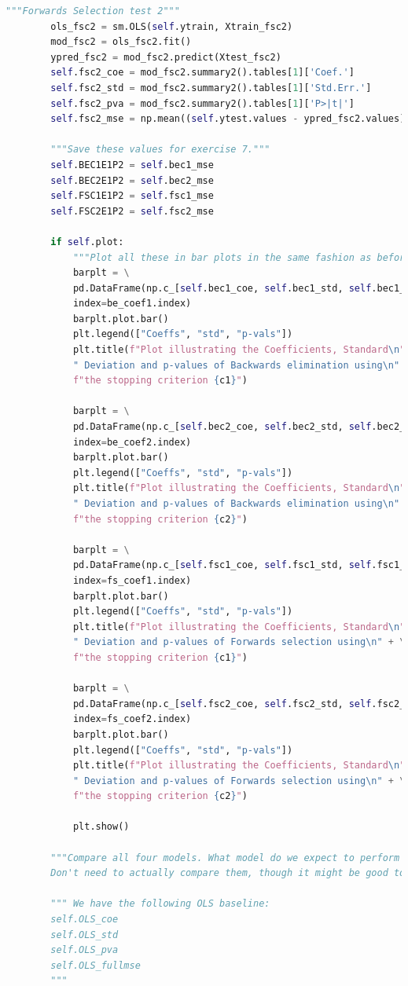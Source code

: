\documentclass[]{article}
\begin{document}
\begin{lstlisting}[language=Python]
		"""Forwards Selection test 2"""
		ols_fsc2 = sm.OLS(self.ytrain, Xtrain_fsc2)
		mod_fsc2 = ols_fsc2.fit()
		ypred_fsc2 = mod_fsc2.predict(Xtest_fsc2)
		self.fsc2_coe = mod_fsc2.summary2().tables[1]['Coef.']
		self.fsc2_std = mod_fsc2.summary2().tables[1]['Std.Err.']
		self.fsc2_pva = mod_fsc2.summary2().tables[1]['P>|t|']
		self.fsc2_mse = np.mean((self.ytest.values - ypred_fsc2.values)**2)
		
		"""Save these values for exercise 7."""
		self.BEC1E1P2 = self.bec1_mse
		self.BEC2E1P2 = self.bec2_mse
		self.FSC1E1P2 = self.fsc1_mse
		self.FSC2E1P2 = self.fsc2_mse
		
		if self.plot:
			"""Plot all these in bar plots in the same fashion as before:"""
			barplt = \
			pd.DataFrame(np.c_[self.bec1_coe, self.bec1_std, self.bec1_pva],\
			index=be_coef1.index)
			barplt.plot.bar()
			plt.legend(["Coeffs", "std", "p-vals"])
			plt.title(f"Plot illustrating the Coefficients, Standard\n"+\
			" Deviation and p-values of Backwards elimination using\n" + \
			f"the stopping criterion {c1}")
			
			barplt = \
			pd.DataFrame(np.c_[self.bec2_coe, self.bec2_std, self.bec2_pva],\
			index=be_coef2.index)
			barplt.plot.bar()
			plt.legend(["Coeffs", "std", "p-vals"])
			plt.title(f"Plot illustrating the Coefficients, Standard\n"+\
			" Deviation and p-values of Backwards elimination using\n" + \
			f"the stopping criterion {c2}")
			
			barplt = \
			pd.DataFrame(np.c_[self.fsc1_coe, self.fsc1_std, self.fsc1_pva],\
			index=fs_coef1.index)
			barplt.plot.bar()
			plt.legend(["Coeffs", "std", "p-vals"])
			plt.title(f"Plot illustrating the Coefficients, Standard\n"+\
			" Deviation and p-values of Forwards selection using\n" + \
			f"the stopping criterion {c1}")
			
			barplt = \
			pd.DataFrame(np.c_[self.fsc2_coe, self.fsc2_std, self.fsc2_pva],\
			index=fs_coef2.index)
			barplt.plot.bar()
			plt.legend(["Coeffs", "std", "p-vals"])
			plt.title(f"Plot illustrating the Coefficients, Standard\n"+\
			" Deviation and p-values of Forwards selection using\n" + \
			f"the stopping criterion {c2}")
			
			plt.show()
		
		"""Compare all four models. What model do we expect to perform better?
		Don't need to actually compare them, though it might be good to check"""
		
		""" We have the following OLS baseline:
		self.OLS_coe
		self.OLS_std
		self.OLS_pva
		self.OLS_fullmse
		"""
		

\end{lstlisting}
\end{document}
